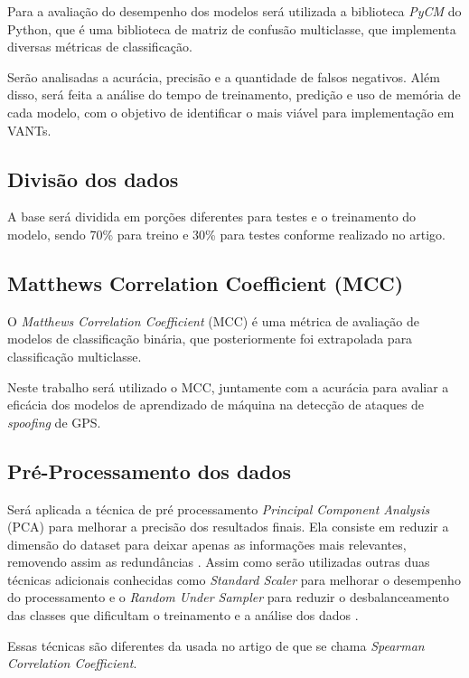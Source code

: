 \documentclass[12pt]{article}
\begin{document}
Para a avaliação do desempenho dos modelos
será utilizada a biblioteca \textit{PyCM} do Python,
que é uma biblioteca de matriz de confusão
multiclasse, que implementa diversas métricas de classificação.
\cite{Haghighi2018}

Serão analisadas a acurácia,
precisão e a quantidade de falsos negativos.
Além disso, será feita a análise do tempo de treinamento,
predição e uso de memória de cada modelo,
com o objetivo de identificar o mais viável
para implementação em VANTs.

\subsection{Divisão dos dados}
A base será dividida em porções
diferentes para testes e o treinamento do modelo,
sendo 70\% para treino e 30\% para testes
conforme realizado no artigo. \cite{Aissou2021}

\subsection{Matthews Correlation Coefficient (MCC)}
O \textit{Matthews Correlation Coefficient} (MCC) é uma métrica
de avaliação de modelos de classificação binária,
que posteriormente foi extrapolada para classificação multiclasse. \cite{MCC}

Neste trabalho será utilizado o MCC,
juntamente com a acurácia para avaliar a eficácia
dos modelos de aprendizado de máquina
na detecção de ataques de \textit{spoofing} de GPS.

\subsection{Pré-Processamento dos dados}

Será aplicada a técnica de pré processamento
\textit{Principal Component Analysis} (PCA) para melhorar
a precisão dos resultados finais. Ela consiste em reduzir a
dimensão do dataset para deixar apenas as informações mais relevantes,
removendo assim as redundâncias \cite {pearson1901}. 
Assim como serão utilizadas
outras duas técnicas adicionais conhecidas como \textit{Standard Scaler} para
melhorar o desempenho do processamento \cite {pearson1894} e o
\textit{Random Under Sampler} para reduzir o desbalanceamento das classes
que dificultam o treinamento e a análise dos dados \cite {japkowicz2000}.

Essas técnicas são
diferentes da usada no artigo de \cite{Aissou2021}
que se chama \textit{Spearman Correlation Coefficient}.
\end{document}
